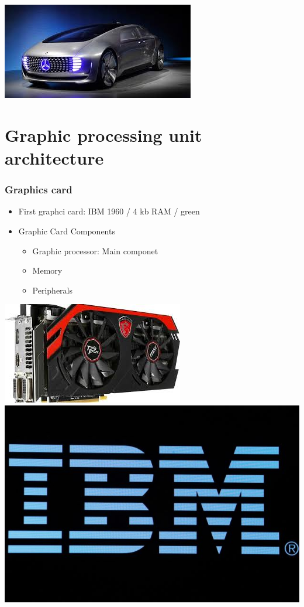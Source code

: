 \documentclass{beamer}
\begin{document}
\begin{frame}
\includegraphics[scale=0.3]{Benz}
\end{frame}
\section{Graphic processing unit architecture}
\begin{frame}
	\frametitle{Graphics card}
	\begin{itemize}
		\item {First graphci card: IBM 1960 / 4 kb RAM / green}
		\item {Graphic Card Components}
		\begin{itemize}
			\item {Graphic processor: Main componet}
			\item {Memory}
			\item {Peripherals}
		\end{itemize}
	\end{itemize}
\includegraphics[scale=0.55]{graphiccard}
\includegraphics[scale=0.3]{ibm}
\end{frame}
\end{document}
